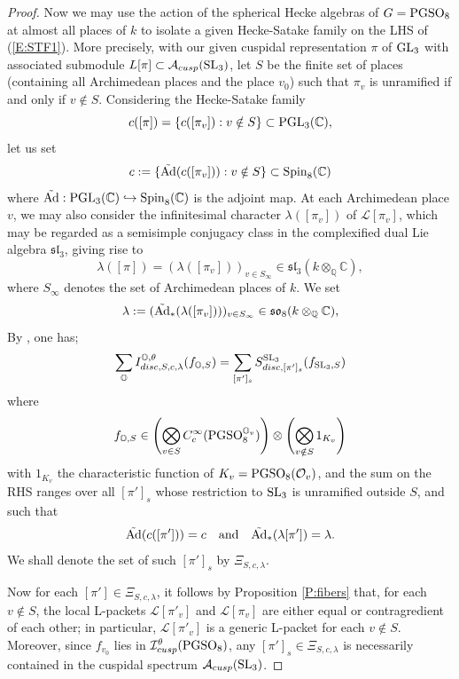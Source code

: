 \documentclass[11pt]{amsart}
\theoremstyle{plain}
\numberwithin{equation}{section}
\newcommand{\Q}{\mathbb Q}
\newcommand{\C}{\mathbb C}
\def\SL{{\rm SL}}
\def\PGSO{{\rm PGSO}}
\def\Spin{{\rm Spin}}
\def\Spin{{\rm Spin}}
\def\GL{{\rm GL}}
\def\PGL{{\rm PGL}}
\def\C{{\bf C}}
\def\C{{\mathbb C}}
\begin{document}
\begin{proof}
Now we may use the action of the spherical Hecke algebras of $G = \PGSO_8$  at almost all places of $k$ to isolate a given Hecke-Satake family on the LHS of (\ref{E:STF1}). 
More precisely, with our given  cuspidal representation $\pi$ of $\GL_3$ with associated submodule $L[\pi] \subset \mathcal{A}_{cusp}(\SL_3)$, let $S$ be the finite set of places (containing all Archimedean places and the place $v_0$) such that $\pi_v$ is unramified if and only if  $v \notin S$. Considering  the Hecke-Satake family 
\[ c ( [\pi]) = \{ c([\pi_v]) : v \notin S \} \subset \PGL_3(\C),\]
 let us set 
\[    c := \{   \tilde{\rm Ad} ( c([\pi_v])): v \notin S \}  \subset \Spin_8(\C) \]
where $\tilde{\rm Ad}:  \PGL_3(\C) \hookrightarrow \Spin_8(\C)$ is the adjoint map. 
At each Archimedean place $v$, we may also consider the infinitesimal character $\lambda([\pi_v])$ of $\mathcal{L}[\pi_v]$, which may be regarded as a semisimple conjugacy class in the complexified dual Lie algebra $\mathfrak{sl}_3$,  giving rise to  
\[  \lambda([\pi]) = ( \lambda([\pi_v]))_{v \in S_{\infty}} \in \mathfrak{sl}_3(k \otimes_{\Q} \C), \]
where $S_{\infty}$ denotes the set of Archimedean places of $k$. 
 We set
\[  \lambda := ( \tilde{\rm Ad}_*(\lambda([\pi_v])) )_{v \in S_{\infty}} \in  \mathfrak{so}_8( k \otimes_{\Q} \C), \]
By \cite[\S X.5.9]{MW2}, one has;
\begin{equation}  \label{E:MW5.9}
    \sum_{\mathbb{O}}  I_{disc, S, c, \lambda}^{\mathbb{O}, \theta} (f_{\mathbb{O} ,S})    = \sum_{ [\pi']_s}  S^{\SL_3}_{disc, [\pi']_s} (f_{\SL_3,S})  \end{equation}
where 
\[ f_{\mathbb{O},S}  \in  \left( \bigotimes_{v \in S} C^{\infty}_c(\PGSO_8^{\mathbb{O}_v}) \right) \otimes \left( \bigotimes_{v \notin S} 1_{K_v} \right) \]
with $1_{K_v}$ the characteristic function of $K_v= \PGSO_8(\mathcal{O}_v)$,  and  
the sum on the RHS ranges over all $[\pi']_s$ whose restriction  to $\SL_3$ is unramified outside $S$, and such that  
\[ \tilde{\rm Ad} ( c([\pi']))  =  c \quad \text{and} \quad  \tilde{\rm Ad}_*(\lambda[\pi']) = \lambda.
\]
We shall denote the set of such $[\pi']_s$ by $\Xi_{S, c, \lambda}$.
\vskip 5pt

Now for each  $[\pi'] \in \Xi_{S, c, \lambda}$, it follows by Proposition \ref{P:fibers} that, for each $v \notin S$,  the local L-packets
 $\mathcal{L}[\pi'_v]$ and $\mathcal{L}[\pi_v]$ are either equal or contragredient of each other; in particular, $\mathcal{L}[\pi'_v]$ is a generic L-packet for each $v \notin S$.  Moreover, since 
 $f_{v_0}$ lies in $\mathcal{I}^{\theta}_{cusp}(\PGSO_8)$, any $[\pi']_s \in \Xi_{S, c, \lambda}$  is necessarily contained in the cuspidal spectrum $\mathcal{A}_{cusp}(\SL_3)$. 
 \vskip 5pt
 

\end{proof}
\end{document}
